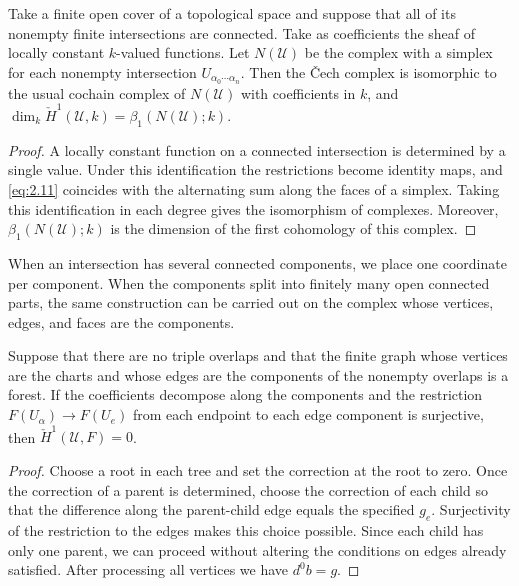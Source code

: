 \begin{proposition}\label{prop:2.25}

Take a finite open cover of a topological space and suppose that all of its nonempty
finite intersections are connected. Take as coefficients the sheaf of locally constant
$k$-valued functions. Let $N(\mathcal{U})$ be the complex with a simplex for each
nonempty intersection $U_{\alpha_0\cdots\alpha_n}$. Then the \v{C}ech complex is
isomorphic to the usual cochain complex of $N(\mathcal{U})$ with coefficients in $k$, and
$\dim_k\check H^1(\mathcal{U},k)=\beta_1(N(\mathcal{U});k)$.

\end{proposition}

\begin{proof}

A locally constant function on a connected intersection is determined by a single value.
Under this identification the restrictions become identity maps, and \eqref{eq:2.11}
coincides with the alternating sum along the faces of a simplex. Taking this
identification in each degree gives the isomorphism of complexes. Moreover,
$\beta_1(N(\mathcal{U});k)$ is the dimension of the first cohomology of this complex.

\end{proof}

When an intersection has several connected components, we place one coordinate per
component. When the components split into finitely many open connected parts, the same
construction can be carried out on the complex whose vertices, edges, and faces are the
components.

\begin{proposition}\label{prop:2.26}

Suppose that there are no triple overlaps and that the finite graph whose vertices are the
charts and whose edges are the components of the nonempty overlaps is a forest. If the
coefficients decompose along the components and the restriction
$F(U_\alpha)\to F(U_e)$ from each endpoint to each edge component is surjective, then
$\check H^1(\mathcal{U},F)=0$.

\end{proposition}

\begin{proof}

Choose a root in each tree and set the correction at the root to zero. Once the correction
of a parent is determined, choose the correction of each child so that the difference
along the parent-child edge equals the specified $g_e$. Surjectivity of the restriction to
the edges makes this choice possible. Since each child has only one parent, we can proceed
without altering the conditions on edges already satisfied. After processing all vertices
we have $d^0b=g$.

\end{proof}


